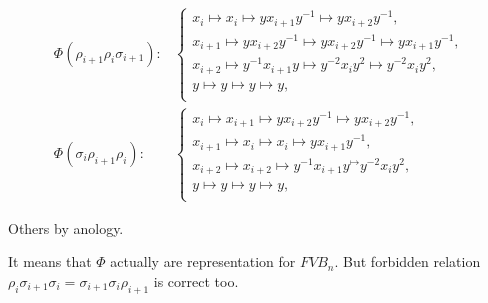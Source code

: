 \documentclass{article}
\begin{document}
\begin{align*}

\Phi(\rho_{i+1}\rho_i\sigma_{i+1}):&

\begin{cases}

x_i \mapsto x_i \mapsto yx_{i+1}y^{-1} \mapsto yx_{i+2}y^{-1},\\

x_{i+1} \mapsto yx_{i+2}y^{-1} \mapsto yx_{i+2}y^{-1} \mapsto yx_{i+1}y^{-1},\\

x_{i+2} \mapsto y^{-1}x_{i+1}y \mapsto y^{-2}x_iy^2 \mapsto y^{-2}x_iy^2,\\

y \mapsto y\mapsto y \mapsto y, \\

\end{cases} \\

\Phi(\sigma_i\rho_{i+1}\rho_i):&

\begin{cases}

x_i \mapsto x_{i+1} \mapsto yx_{i+2}y^{-1} \mapsto yx_{i+2}y^{-1},\\

x_{i+1} \mapsto x_i \mapsto x_i \mapsto yx_{i+1}y^{-1},\\

x_{i+2} \mapsto x_{i+2} \mapsto y^{-1}x_{i+1}y^ \mapsto y^{-2}x_iy^2,\\

y \mapsto y\mapsto y \mapsto y, \\

\end{cases}

\end{align*}



Others by anology.





It means that $\Phi$ actually are representation for $FVB_n$. But forbidden relation $\rho_i\sigma_{i+1}\sigma_i = \sigma_{i+1}\sigma_i\rho_{i+1}$ is correct too.
\end{document}
